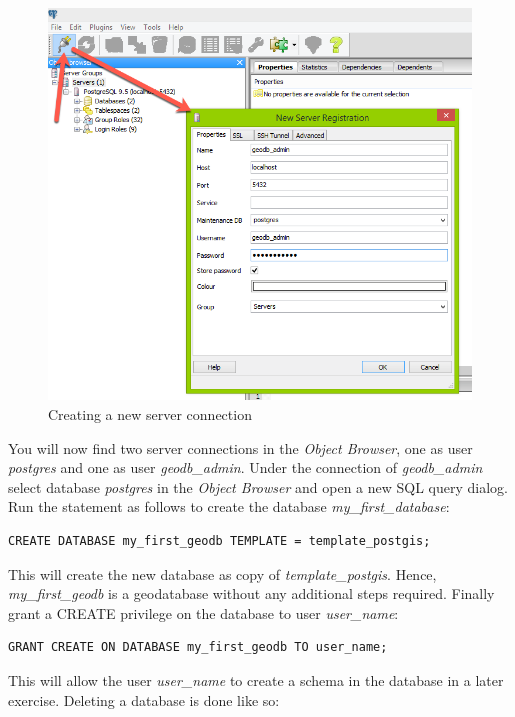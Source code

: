 \documentclass[a4paper,12pt,titlepage]{article}
\begin{document}
\begin{figure}[htb]
	\centering
	\includegraphics[width=12cm]{Images/new_server_conn.png}
	\caption{Creating a new server connection}\label{fig:new_server_conn}
\end{figure}

You will now find two server connections in the \textit{Object Browser}, one as user \textit{postgres} and one as user \textit{geodb\_admin}. Under the connection of \textit{geodb\_admin} select database \textit{postgres} in the \textit{Object Browser} and open a new SQL query dialog. Run the statement as follows to create the database \textit{my\_first\_database}:

\begin{lstlisting}[caption={Creating the training database}]
CREATE DATABASE my_first_geodb TEMPLATE = template_postgis;
\end{lstlisting}

This will create the new database as copy of \textit{template\_postgis}. Hence, \textit{my\_first\_geodb} is a geodatabase without any additional steps required. Finally grant a CREATE privilege on the database to user \textit{user\_name}:

\begin{lstlisting}[caption={Granting a CREATE privilege on a database}]
GRANT CREATE ON DATABASE my_first_geodb TO user_name;
\end{lstlisting}

This will allow the user \textit{user\_name} to create a schema in the database in a later exercise.
Deleting a database is done like so:
\end{document}
